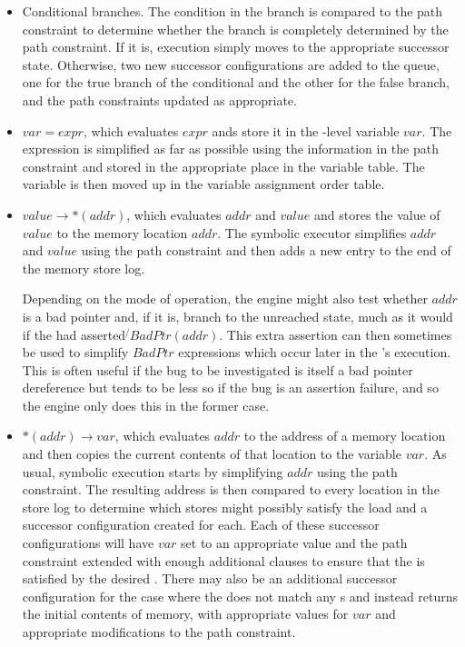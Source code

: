 \begin{itemize}
\item Conditional branches.  The condition in the branch is compared
  to the path constraint to determine whether the branch is completely
  determined by the path constraint.  If it is, execution simply moves
  to the appropriate successor state.  Otherwise, two new successor
  configurations are added to the queue, one for the true branch of
  the conditional and the other for the false branch, and the path
  constraints updated as appropriate.
\item {} $var = expr$, which evaluates $expr$ ands store it
  in the {\StateMachine}-level variable $var$.  The expression is
  simplified as far as possible using the information in the path
  constraint and stored in the appropriate place in the variable
  table.  The variable is then moved up in the variable assignment
  order table.
\item {} $value \rightarrow \ast(addr)$, which evaluates
  $addr$ and $value$ and stores the value of $value$ to the memory
  location $addr$.  The symbolic executor simplifies $addr$ and
  $value$ using the path constraint and then adds a new entry to the
  end of the memory store log.

  Depending on the mode of operation, the engine might also test
  whether $addr$ is a bad pointer and, if it is, branch to the
  unreached state, much as it would if the {\StateMachine} had
  asserted $\not{}BadPtr(addr)$.  This extra assertion can then
  sometimes be used to simplify $BadPtr$ expressions which occur later
  in the {\StateMachine}'s execution.  This is often useful if the bug
  to be investigated is itself a bad pointer dereference but tends to
  be less so if the bug is an assertion failure, and so the engine
  only does this in the former case.

\item {} $\ast(addr) \rightarrow var$, which evaluates
  $addr$ to the address of a memory location and then copies the
  current contents of that location to the {\StateMachine} variable
  $var$.  As usual, symbolic execution starts by simplifying $addr$
  using the path constraint.  The resulting address is then compared
  to every location in the store log to determine which stores might
  possibly satisfy the load and a successor configuration created for
  each.  Each of these successor configurations will have $var$ set to
  an appropriate value and the path constraint extended with enough
  additional clauses to ensure that the  is satisfied by
  the desired .  There may also be an additional
  successor configuration for the case where the  does not
  match any s and instead returns the initial contents of
  memory, with appropriate values for $var$ and appropriate
  modifications to the path constraint.


\end{itemize}
